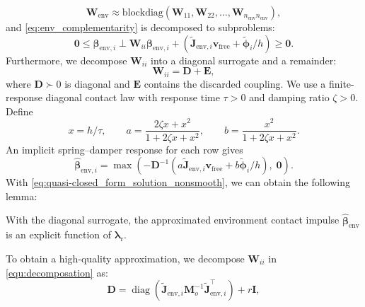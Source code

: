 \begin{equation}
\boldsymbol{W}_{\text{env}} \approx \text{blockdiag}(\boldsymbol{W}_{11}, \boldsymbol{W}_{22}, \ldots, \boldsymbol{W}_{n_{\text{env}} n_{\text{env}}}),
\end{equation}
and \eqref{eq:env_complementarity} is decomposed to subproblems:
\begin{equation}
\boldsymbol{0} \leq \boldsymbol{\beta}_{\text{env},i} \perp \boldsymbol{W}_{ii} \boldsymbol{\beta}_{\text{env},i} + (\boldsymbol{\tilde{J}}_{\text{env},i} \boldsymbol{v}_{\mathrm{free}} + \boldsymbol{\tilde{\phi}}_i/h) \geq \boldsymbol{0}.
\label{equ:contact_i_complementarity}
\end{equation}
Furthermore, we decompose $\boldsymbol{W}_{ii}$ into a diagonal surrogate and a remainder:
\begin{equation}
\boldsymbol{W}_{ii} = \boldsymbol{D} + \boldsymbol{E}, \label{equ:decomposation}
\end{equation}
where $\boldsymbol{D}\succ0$ is diagonal and $\boldsymbol{E}$ contains the discarded coupling. We use a finite-response diagonal contact law with response time $\tau>0$ and damping ratio $\zeta>0$. Define
\begin{equation}
 x=h/\tau,\qquad
 a=\frac{2\zeta x+x^2}{1+2\zeta x+x^2},\qquad
 b=\frac{x^2}{1+2\zeta x+x^2}.
 \label{eq:scm_response_coefficients}
\end{equation}
An implicit spring--damper response for each row gives
\begin{equation}
\boldsymbol{\hat{\beta}}_{\text{env}, i}
=
\max
\left(
-
\boldsymbol{D}^{-1}
(a\boldsymbol{\tilde{J}}_{\text{env},i} \boldsymbol{v}_{\mathrm{free}} + b\boldsymbol{\tilde{\phi}}_i/h),
\;\boldsymbol{0}
\right).
\label{eq:quasi-closed_form_solution_nonsmooth}
\end{equation}
With \eqref{eq:quasi-closed_form_solution_nonsmooth}, we can obtain the following lemma:
\begin{lemma}
With the diagonal surrogate, the approximated environment contact impulse $\boldsymbol{\hat{\beta}}_{\text{env}}$ is an explicit function of $\boldsymbol{\lambda}_{\text{r}}$.
\end{lemma}
To obtain a high-quality approximation, we decompose $\boldsymbol{W}_{ii}$ in \eqref{equ:decomposation} as:
\begin{equation}\label{equ:max_decomposition}
\boldsymbol{D}=\operatorname{diag}(\boldsymbol{\tilde J}_{\mathrm{env},i}\boldsymbol{M}_o^{-1}\boldsymbol{\tilde J}_{\mathrm{env},i}^\top)+r\boldsymbol{I},
\end{equation}
